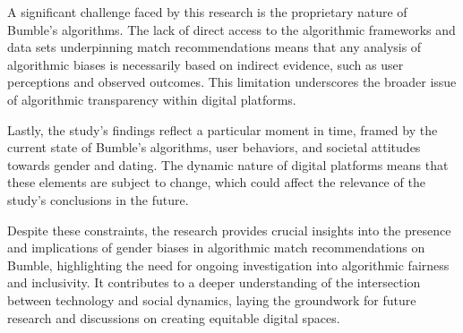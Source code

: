 A significant challenge faced by this research is the proprietary nature of Bumble’s algorithms. The lack of direct access to the algorithmic frameworks and data sets underpinning match recommendations means that any analysis of algorithmic biases is necessarily based on indirect evidence, such as user perceptions and observed outcomes. This limitation underscores the broader issue of algorithmic transparency within digital platforms.

Lastly, the study's findings reflect a particular moment in time, framed by the current state of Bumble’s algorithms, user behaviors, and societal attitudes towards gender and dating. The dynamic nature of digital platforms means that these elements are subject to change, which could affect the relevance of the study’s conclusions in the future.

Despite these constraints, the research provides crucial insights into the presence and implications of gender biases in algorithmic match recommendations on Bumble, highlighting the need for ongoing investigation into algorithmic fairness and inclusivity. It contributes to a deeper understanding of the intersection between technology and social dynamics, laying the groundwork for future research and discussions on creating equitable digital spaces.

